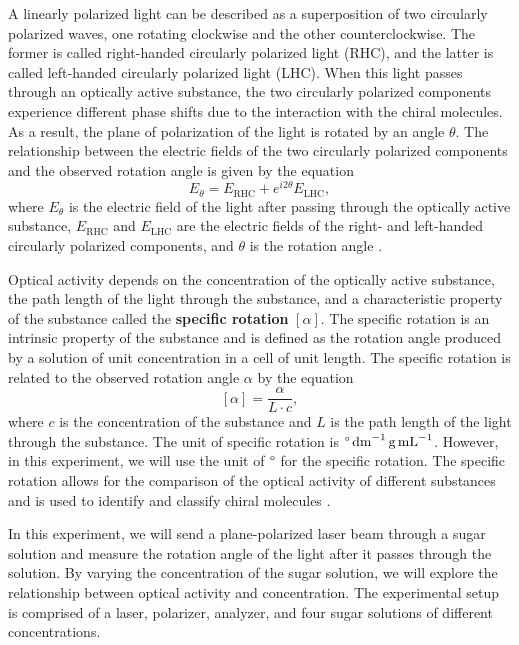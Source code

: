 \documentclass[10pt]{article}
\begin{document}
A linearly polarized light can be described as a superposition of two circularly polarized waves, one rotating clockwise and the other counterclockwise. The former is called right-handed circularly polarized light (RHC), and the latter is called left-handed circularly polarized light (LHC). When this light passes through an optically active substance, the two circularly polarized components experience different phase shifts due to the interaction with the chiral molecules. As a result, the plane of polarization of the light is rotated by an angle $\theta$. The relationship between the electric fields of the two circularly polarized components and the observed rotation angle is given by the equation
\begin{equation}\label{eq:1}
    E_{\theta} = E_{\text{RHC}} + e^{i2\theta}E_{\text{LHC}},
\end{equation}
where $E_{\theta}$ is the electric field of the light after passing through the optically active substance, $E_{\text{RHC}}$ and $E_{\text{LHC}}$ are the electric fields of the right- and left-handed circularly polarized components, and $\theta$ is the rotation angle \cite{Raymond_2013}.

Optical activity depends on the concentration of the optically active substance, the path length of the light through the substance, and a characteristic property of the substance called the \textbf{specific rotation} $\left[\alpha\right]$. The specific rotation is an intrinsic property of the substance and is defined as the rotation angle produced by a solution of unit concentration in a cell of unit length. The specific rotation is related to the observed rotation angle $\alpha$ by the equation
\begin{equation}\label{eq:2}
 \left[ \alpha \right] = \frac{\alpha}{L \cdot c},
\end{equation}
where $c$ is the concentration of the substance and $L$ is the path length of the light through the substance. The unit of specific rotation is $\degree \, \text{dm}^{-1} \, \text{g} \, \text{mL}^{-1}$. However, in this experiment, we will use the unit of $\degree$ for the specific rotation. The specific rotation allows for the comparison of the optical activity of different substances and is used to identify and classify chiral molecules \cite{Bruice_2017}.

In this experiment, we will send a plane-polarized laser beam through a sugar solution and measure the rotation angle of the light after it passes through the solution. By varying the concentration of the sugar solution, we will explore the relationship between optical activity and concentration. The experimental setup is comprised of a laser, polarizer, analyzer, and four sugar solutions of different concentrations. 
\end{document}
